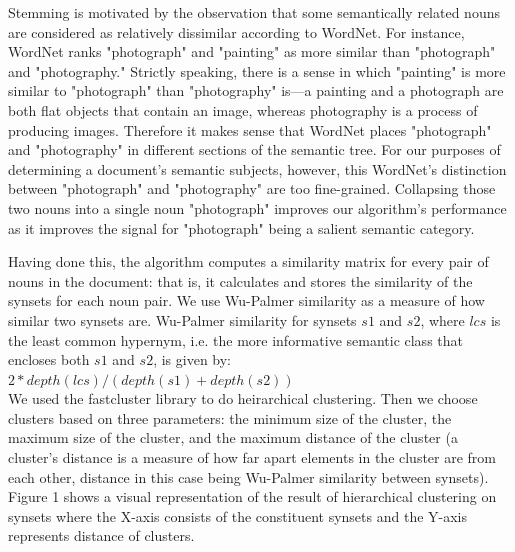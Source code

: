 \documentclass[12pt]{article}
\begin{document}
Stemming is motivated by the observation that some semantically related nouns are considered as relatively dissimilar according to WordNet. For instance, WordNet ranks "photograph" and "painting" as more similar than "photograph" and "photography." Strictly speaking, there is a sense in which "painting" is more similar to "photograph" than "photography" is—a painting and a photograph are both flat objects that contain an image, whereas photography is a process of producing images. Therefore it makes sense that WordNet places "photograph" and "photography" in different sections of the semantic tree. For our purposes of determining a document's semantic subjects, however, this WordNet's distinction between "photograph" and "photography" are too fine-grained. Collapsing those two nouns into a single noun "photograph" improves our algorithm's performance as it improves the signal for "photograph" being a salient semantic category.

Having done this, the algorithm computes a similarity matrix for every pair of nouns in the document: that is, it calculates and stores the similarity of the synsets for each noun pair. We use Wu-Palmer similarity as a measure of how similar two synsets are. Wu-Palmer similarity for synsets $s1$ and $s2$, where $lcs$ is the least common hypernym, i.e. the more informative semantic class that encloses both $s1$ and $s2$, is given by:\\

$2*depth(lcs) / (depth(s1) + depth(s2))$\\

We used the fastcluster library to do heirarchical clustering. Then we choose clusters based on three parameters: the minimum size of the cluster, the maximum size of the cluster, and the maximum distance of the cluster (a cluster's distance is a measure of how far apart elements in the cluster are from each other, distance in this case being Wu-Palmer similarity between synsets). Figure 1 shows a visual representation of the result of hierarchical clustering on synsets where the X-axis consists of the constituent synsets and the Y-axis represents distance of clusters.
\end{document}
